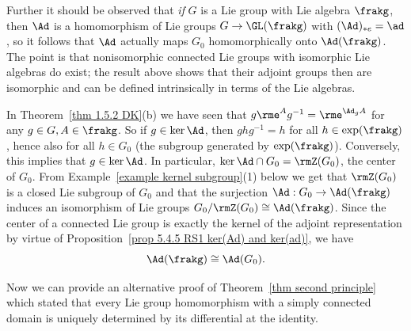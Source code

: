 \begin{example}
    Further it should be observed that \emph{if} $G$ is a Lie group with Lie algebra $\frakg$, then $\Ad$ is a homomorphism of Lie groups $G\to\GL(\frakg)$ with $(\Ad)_{\ast e}=\ad$, so it follows that $\Ad$ actually maps $G_0$ homomorphically onto $\Ad(\frakg)$. The point is that nonisomorphic connected Lie groups with isomorphic Lie algebras do exist; the result above shows that their adjoint groups then are isomorphic and can be defined intrinsically in terms of the Lie algebras.

    In Theorem~\ref{thm 1.5.2 DK}(b) we have seen that $g\rme^A g^{-1}=\rme^{\Ad_g A}$ for any $g\in G,A\in\frakg$. So if $g\in\ker \Ad$, then $ghg^{-1}=h$ for all $h\in \exp(\frakg)$, hence also for all $h\in G_0$ (the subgroup generated by $\exp(\frakg)$). Conversely, this implies that $g\in\ker \Ad$. In particular, $\ker\Ad\cap G_0=\rmZ(G_0)$, the center of $G_0$. From Example~\ref{example kernel subgroup}(1) below we get that $\rmZ(G_0)$ is a closed Lie subgroup of $G_0$ and that the surjection $\Ad:G_0\to \Ad(\frakg)$ induces an isomorphism of Lie groups $G_0\slash \rmZ(G_0)\cong \Ad(\frakg)$. Since the center of a connected Lie group is exactly the kernel of
    the adjoint representation by virtue of Proposition~\ref{prop 5.4.5 RS1 ker(Ad) and ker(ad)}, we have 
    \[\Ad(\frakg)\cong \Ad(G_0).\]
\end{example}



Now we can provide an alternative proof of Theorem~\ref{thm second principle} which stated that every Lie group homomorphism with a simply connected domain is uniquely determined by its differential at the identity.


